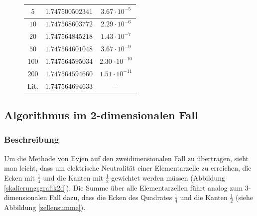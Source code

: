 \documentclass[10pt,a4paper]{article}
\begin{document}
\begin{figure}
\begin{minipage}[c]{0.5\textwidth}
\begin{center}
\begin{tabular}{c|c|c}
\hline
\rule[-1ex]{0pt}{2.5ex} $5$ & $1.747500502341$ & $3.67\cdot10^{-5}$ \\ 
\hline 
\rule[-1ex]{0pt}{2.5ex} $10$ & $1.747568603772$ & $2.29\cdot10^{-6}$ \\ 
\hline 
\rule[-1ex]{0pt}{2.5ex} $20$ & $1.747564845218$ & $1.43\cdot10^{-7}$ \\ 
\hline 
\rule[-1ex]{0pt}{2.5ex} $50$ & $1.747564601048$ & $3.67\cdot10^{-9}$ \\
\hline
\rule[-1ex]{0pt}{2.5ex} $100$ & $1.747564595034$ & $2.30\cdot10^{-10}$ \\ 
\hline
\rule[-1ex]{0pt}{2.5ex} $200$ & $1.747564594660$ & $1.51\cdot10^{-11}$ \\ 
\hline
\rule[1ex]{0pt}{2.5ex} Lit. & $1.747564694633$ & $ - $ \\
\end{tabular}
\end{center}
\end{minipage}
\end{figure}

\subsection{Algorithmus im 2-dimensionalen Fall}
\subsubsection{Beschreibung}
Um die Methode von Evjen auf den zweidimensionalen Fall zu übertragen, sieht man leicht,
dass um elektrische Neutralität einer Elementarzelle zu erreichen, die Ecken mit $\frac{1}{4}$
und die Kanten mit $\frac{1}{2}$ gewichtet werden müssen (Abbildung \ref{skalierungsgrafik2d}).
Die Summe über alle Elementarzellen führt analog zum 3-dimensionalen Fall dazu, dass die Ecken
des Quadrates $\frac{1}{4}$ und die Kanten $\frac{1}{2}$ (siehe Abbildung \ref{zellensumme}).
\end{document}

